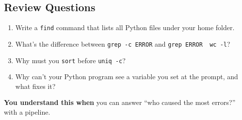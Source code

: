 \subsection*{Review Questions}\label{05-the-everyday-command-line:review-questions}

\begin{enumerate}
\def\labelenumi{\arabic{enumi}.}
\tightlist
\item
  Write a \texttt{find} command that lists all Python files under your home folder.
\item
  What's the difference between \texttt{grep\ -c\ ERROR} and \texttt{grep\ ERROR\ \textbar{}\ wc\ -l}?
\item
  Why must you \texttt{sort} before \texttt{uniq\ -c}?
\item
  Why can't your Python program see a variable you set at the prompt, and what fixes it?
\end{enumerate}

\begin{understandbox}

\textbf{You understand this when} you can answer ``who caused the most errors?'' with a pipeline.

\end{understandbox}
